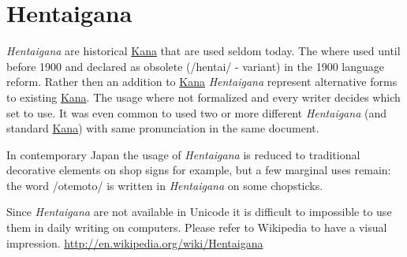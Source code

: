 \section{Hentaigana} 
\label{sec:Hentaigana}

\textit{Hentaigana} are historical \hyperref[sec:Kana]{Kana} that are used
seldom today. The where  used until before 1900 and declared as obsolete
(/hentai/ - variant) in the 1900 language reform.  Rather then an addition to
\hyperref[sec:Kana]{Kana} \textit{Hentaigana} represent alternative forms to
existing \hyperref[sec:Kana]{Kana}. The usage where not formalized and every
writer decides which set to use. It was even common to used two or more
different \textit{Hentaigana} (and standard \hyperref[sec:Kana]{Kana}) with
same pronunciation in the same document. 

In contemporary Japan the usage of \textit{Hentaigana} is reduced to
traditional decorative elements on shop signs for example, but a few marginal
uses remain: the word /otemoto/ is written in \textit{Hentaigana} on some
chopsticks.

Since \textit{Hentaigana} are not available in Unicode it is difficult to
impossible to use them in daily writing on computers. Please refer to Wikipedia
to have a visual impression. \Link
\href{http://en.wikipedia.org/wiki/Hentaigana}{http://en.wikipedia.org/wiki/Hentaigana}



